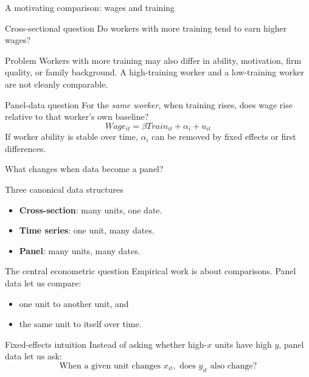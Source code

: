 \documentclass[10pt]{beamer}
\begin{document}
\begin{frame}{A motivating comparison: wages and training}
\small
\begin{block}{Cross-sectional question}
Do workers with more training tend to earn higher wages?
\end{block}

\pause
\begin{alertblock}{Problem}
Workers with more training may also differ in ability, motivation, firm quality, or family background. A high-training worker and a low-training worker are not cleanly comparable.
\end{alertblock}

\pause
\begin{exampleblock}{Panel-data question}
For the \emph{same worker}, when training rises, does wage rise relative to that worker's own baseline?
\[
Wage_{it} = \beta Train_{it} + \alpha_i + u_{it}
\]
If worker ability is stable over time, $\alpha_i$ can be removed by fixed effects or first differences.
\end{exampleblock}
\end{frame}

\begin{frame}{What changes when data become a panel?}
\label{slide:comparisons}
\begin{block}{Three canonical data structures}
\begin{itemize}
  \item \textbf{Cross-section}: many units, one date.
  \item \textbf{Time series}: one unit, many dates.
  \item \textbf{Panel}: many units, many dates.
\end{itemize}
\end{block}

\pause
\begin{alertblock}{The central econometric question}
Empirical work is about comparisons. Panel data let us compare:
\begin{itemize}
  \item one unit to another unit, and
  \item the same unit to itself over time.
\end{itemize}
\end{alertblock}

\pause
\begin{exampleblock}{Fixed-effects intuition}
Instead of asking whether high-$x$ units have high $y$, panel data let us ask:
\[
\text{When a given unit changes } x_{it}, \text{ does } y_{it} \text{ also change?}
\]
\end{exampleblock}
\end{frame}
\end{document}
